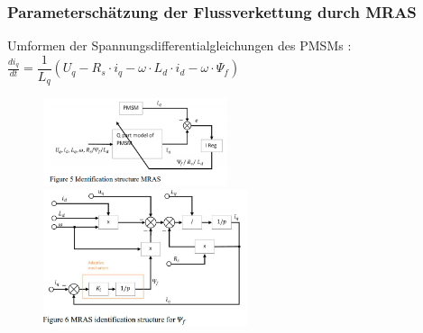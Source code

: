 \documentclass[serif,11pt, xcolor=table]{beamer}
\begin{document}
\begin{frame}
	\frametitle{Parameterschätzung der Flussverkettung durch MRAS}
	
	\vskip 0.2cm
	Umformen der Spannungsdifferentialgleichungen des PMSMs :\\
	\vskip 0.2cm
	$\frac{di_{q}}{dt}=\dfrac{1}{L_{q}}(U_{q}-R_{s}\cdot i_{q}-\omega \cdot L_{d}\cdot i_{d}-\omega \cdot \Psi_{f})$
	
	
	
	\begin{figure}[htbp]
		\centering
		\begin{minipage}[t]{0.48\textwidth}
			\centering
			\includegraphics[width=5.4cm]{Abbildungen/MRAS2.PNG}
			
		\end{minipage}
		\begin{minipage}[t]{0.48\textwidth}
			\centering
			\includegraphics[width=6cm]{Abbildungen/MRAS3.JPG}
			
		\end{minipage}
	\end{figure}
	
\end{frame}
\end{document}
